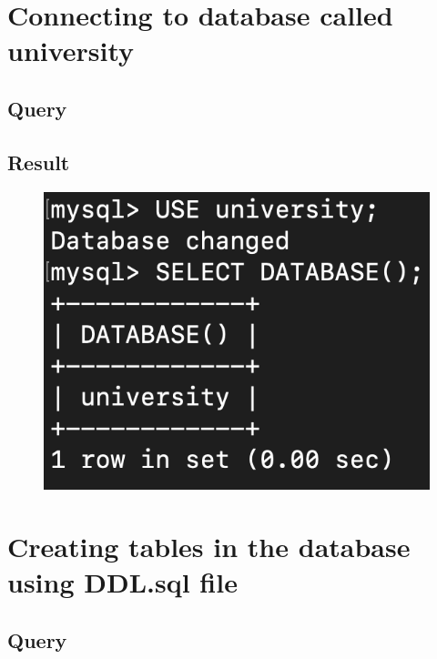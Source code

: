 \documentclass[12pt]{article}
\begin{document}
\newpage
\section{Connecting to database called university}

\subsection{Query}

\subsection{Result}
\begin{figure}[!hbt]
    \centering
    \includegraphics[scale=1.7]{screenshots/3.png}
    \label{fig:my_label1}
\end{figure}

\newpage

\section{Creating tables in the database using DDL.sql file}

\subsection{Query}
\end{document}
